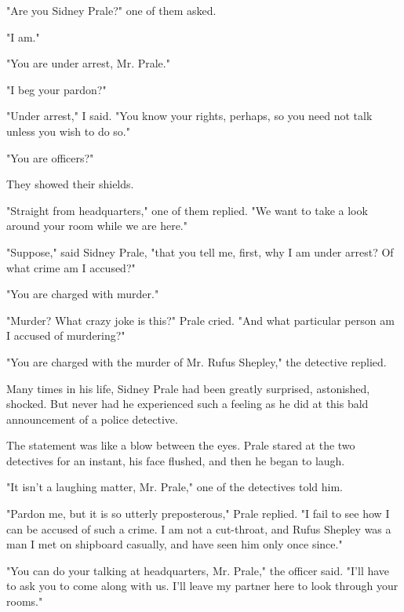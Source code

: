 \documentclass{novel}
\begin{document}
"Are you Sidney Prale?" one of them asked.

"I am."

"You are under arrest, Mr. Prale."

"I beg your pardon?"

"Under arrest," I said. "You know your rights, perhaps, so you need not talk unless you wish to do so."

"You are officers?"

They showed their shields.

"Straight from headquarters," one of them replied. "We want to take a look around your room while we are here."

"Suppose," said Sidney Prale, "that you tell me, first, why I am under arrest? Of what crime am I accused?"

"You are charged with murder."

"Murder? What crazy joke is this?" Prale cried. "And what particular person am I accused of murdering?"

"You are charged with the murder of Mr. Rufus Shepley," the detective replied.

\vspace{2\nbs}
\clearpage
\thispagestyle{empty}

\begin{ChapterStart}
\vspace{3\nbs}
\end{ChapterStart}
    
Many times in his life, Sidney Prale had been greatly surprised, astonished, shocked. But never had he experienced such a feeling as he did at this bald announcement of a police detective.

The statement was like a blow between the eyes. Prale stared at the two detectives for an instant, his face flushed, and then he began to laugh.

"It isn't a laughing matter, Mr. Prale," one of the detectives told him.

"Pardon me, but it is so utterly preposterous," Prale replied. "I fail to see how I can be accused of such a crime. I am not a cut-throat, and Rufus Shepley was a man I met on shipboard casually, and have seen him only once since."

"You can do your talking at headquarters, Mr. Prale," the officer said. "I'll have to ask you to come along with us. I'll leave my partner here to look through your rooms."
\end{document}
